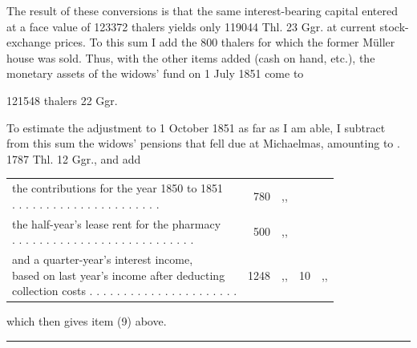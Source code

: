 The result of these conversions is that the same interest-bearing capital entered at a face value of 123372 thalers yields only 119044 Thl. 23 Ggr. at current stock-exchange prices. To this sum I add the 800 thalers for which the former Müller house was sold. Thus, with the other items added (cash on hand, etc.), the monetary assets of the widows' fund on 1 July 1851 come to
\begin{center}121548 thalers 22 Ggr.\end{center}
\noindent\hspace*{\parindent}To estimate the adjustment to 1 October 1851 as far as I am able, I subtract from this sum the widows' pensions that fell due at Michaelmas, amounting to . 1787 Thl. 12 Ggr., and add
\begin{center}
\small\setlength{\tabcolsep}{2pt}
\begin{tabular}{l r l r l}
\shortstack[l]{the contributions for the year 1850 to 1851\\. . . . . . . . . . . . . . . . . . . . . .}&780&,,&&\\
\shortstack[l]{the half-year's lease rent for the pharmacy\\. . . . . . . . . . . . . . . . . . . . . . . . . . .}&500&,,&&\\
\shortstack[l]{and a quarter-year's interest income,\\based on last year's income after deducting\\collection costs . . . . . . . . . . . . . . . . . . . . . .}&1248&,,&10&,,
\end{tabular}
\end{center}
\noindent which then gives item (9) above.

\begin{center}\rule{.28\linewidth}{.3pt}\end{center}
